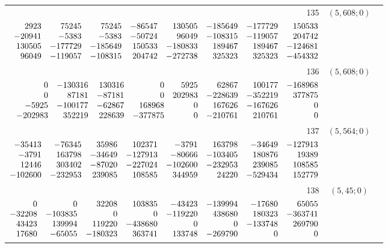 \documentclass[11pt]{article}
\theoremstyle{remark}
\numberwithin{equation}{section}
\begin{document}
\begin{longtable}{rcl}
135 & $(5,608;0)$ & \begin{tabular}[t]{@{}l@{}}$w_i=\displaystyle \frac{3149021250202078981}{5004184087032106602880000000000000000}$\\[3pt]{\scriptsize$\begin{array}{@{}rrrrrrrr@{}}2923 & 75245 & 75245 & -86547 & 130505 & -185649 & -177729 & 150533\\-20941 & -5383 & -5383 & -50724 & 96049 & -108315 & -119057 & 204742\\130505 & -177729 & -185649 & 150533 & -180833 & 189467 & 189467 & -124681\\96049 & -119057 & -108315 & 204742 & -272738 & 325323 & 325323 & -454332\end{array}$}\end{tabular}\\[8pt]
136 & $(5,608;0)$ & \begin{tabular}[t]{@{}l@{}}$w_i=\displaystyle \frac{7212844717445993733}{7456607233096421135360000000000000000}$\\[3pt]{\scriptsize$\begin{array}{@{}rrrrrrrr@{}}0 & -130316 & 130316 & 0 & 5925 & 62867 & 100177 & -168968\\0 & 87181 & -87181 & 0 & 202983 & -228639 & -352219 & 377875\\-5925 & -100177 & -62867 & 168968 & 0 & 167626 & -167626 & 0\\-202983 & 352219 & 228639 & -377875 & 0 & -210761 & 210761 & 0\end{array}$}\end{tabular}\\[8pt]
137 & $(5,564;0)$ & \begin{tabular}[t]{@{}l@{}}$w_i=\displaystyle \frac{141693271291691529}{524342311754256592000000000000000000}$\\[3pt]{\scriptsize$\begin{array}{@{}rrrrrrrr@{}}-35413 & -76345 & 35986 & 102371 & -3791 & 163798 & -34649 & -127913\\-3791 & 163798 & -34649 & -127913 & -80666 & -103405 & 180876 & 19389\\12446 & 303402 & -87020 & -227024 & -102600 & -232953 & 239085 & 108585\\-102600 & -232953 & 239085 & 108585 & 344959 & 24220 & -529434 & 152779\end{array}$}\end{tabular}\\[8pt]
138 & $(5,45;0)$ & \begin{tabular}[t]{@{}l@{}}$w_i=\displaystyle \frac{1492370246080549}{1852985261944750400000000000000000}$\\[3pt]{\scriptsize$\begin{array}{@{}rrrrrrrr@{}}0 & 0 & 32208 & 103835 & -43423 & -139994 & -17680 & 65055\\-32208 & -103835 & 0 & 0 & -119220 & 438680 & 180323 & -363741\\43423 & 139994 & 119220 & -438680 & 0 & 0 & -133748 & 269790\\17680 & -65055 & -180323 & 363741 & 133748 & -269790 & 0 & 0\end{array}$}\end{tabular}\\[8pt]

\end{longtable}
\end{document}
